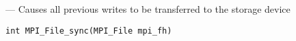 \startmanpage
{}
--- Causes all previous writes to be transferred to the storage device 
\startvb\begin{verbatim}
int MPI_File_sync(MPI_File mpi_fh)

\end{verbatim}
\endvb

\par
{}
\endmanpage
